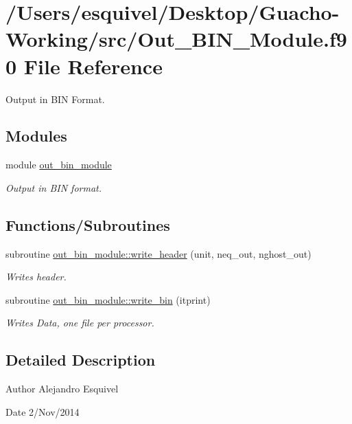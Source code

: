 \hypertarget{_out___b_i_n___module_8f90}{}\section{/\+Users/esquivel/\+Desktop/\+Guacho-\/\+Working/src/\+Out\+\_\+\+B\+I\+N\+\_\+\+Module.f90 File Reference}
\label{_out___b_i_n___module_8f90}


Output in B\+I\+N Format.  


\subsection*{Modules}
\begin{DoxyCompactItemize}
\item 
module \hyperlink{namespaceout__bin__module}{out\+\_\+bin\+\_\+module}
\begin{DoxyCompactList}\small\item\em Output in B\+I\+N format. \end{DoxyCompactList}\end{DoxyCompactItemize}
\subsection*{Functions/\+Subroutines}
\begin{DoxyCompactItemize}
\item 
subroutine \hyperlink{namespaceout__bin__module_a6e5fb4bb1cc6f0a15ce591a3b1014d8d}{out\+\_\+bin\+\_\+module\+::write\+\_\+header} (unit, neq\+\_\+out, nghost\+\_\+out)
\begin{DoxyCompactList}\small\item\em Writes header. \end{DoxyCompactList}\item 
subroutine \hyperlink{namespaceout__bin__module_ac5772f05ffdd0227d2fc17e27beb0f59}{out\+\_\+bin\+\_\+module\+::write\+\_\+bin} (itprint)
\begin{DoxyCompactList}\small\item\em Writes Data, one file per processor. \end{DoxyCompactList}\end{DoxyCompactItemize}


\subsection{Detailed Description}
\begin{DoxyAuthor}{Author}
Alejandro Esquivel 
\end{DoxyAuthor}
\begin{DoxyDate}{Date}
2/\+Nov/2014 
\end{DoxyDate}
